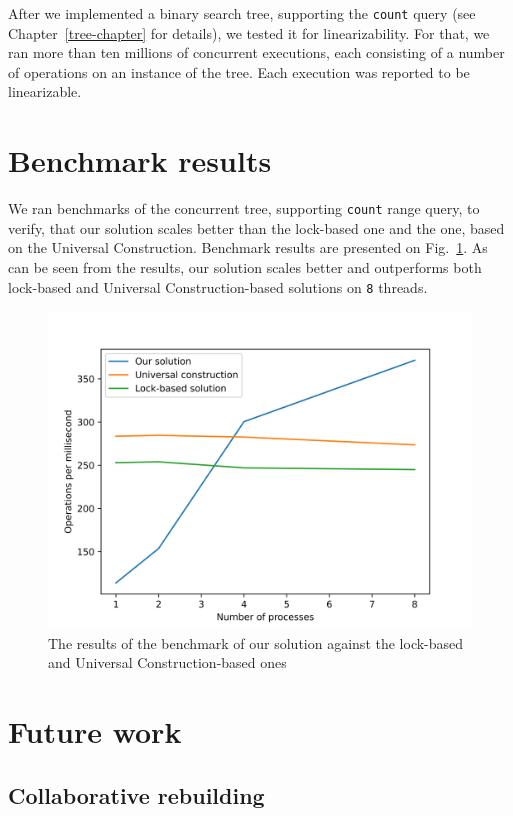 \documentclass[times, dvipsnames,%
               languages={russian,english} %
              ]{itmo-student-thesis}
\begin{document}
After we implemented a binary search tree, supporting the \texttt{count} query (see Chapter~\ref{tree-chapter} for details), we tested it for linearizability. For that, we ran more than ten millions of concurrent executions, each consisting of a number of operations on an instance of the tree. Each execution was reported to be linearizable.

\section{Benchmark results}

We ran benchmarks of the concurrent tree, supporting \texttt{count} range query, to verify, that our solution scales better than the lock-based one and the one, based on the Universal Construction. Benchmark results are presented on Fig.~\ref{bench-main-pic}. As can be seen from the results, our solution scales better and outperforms both lock-based and Universal Construction-based solutions on \texttt{8} threads.

\begin{figure}[H]
  \centering
  \caption{The results of the benchmark of our solution against the lock-based and Universal Construction-based ones}
  \label{bench-main-pic}
  \includegraphics[width=\linewidth]{pics/fig.png}
\end{figure}

\section{Future work}

\subsection{Collaborative rebuilding}
\end{document}
